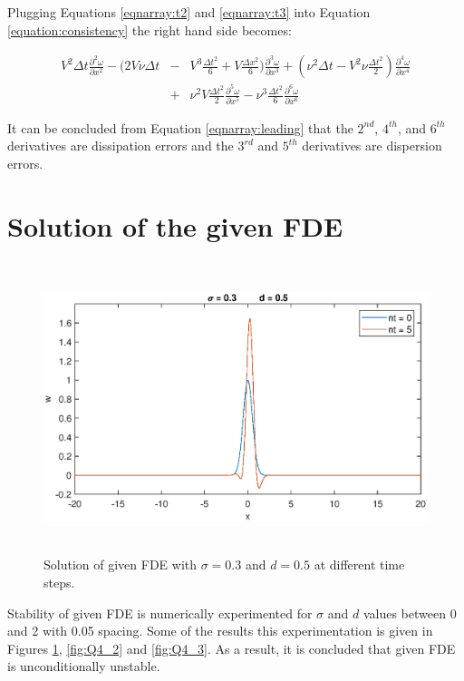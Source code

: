 \documentclass[letterpaper,12pt]{article}
\begin{document}
Plugging Equations \ref{eqnarray:t2} and \ref{eqnarray:t3} into Equation \ref{equation:consistency} the
right hand side becomes:

\begin{eqnarray}
	V^2\Delta t \frac{\partial^2 \omega}{\partial x^2} - (2V\nu\Delta t &-&V^3\frac{\Delta t^2}{6} + V\frac{\Delta x^2}{6})\frac{\partial^3 \omega}{\partial x^3} + (\nu^2\Delta t -V^2\nu\frac{\Delta t^2}{2})\frac{\partial^4 \omega}{\partial x^4} \nonumber \\
	&+& \nu^2V\frac{\Delta t^2}{2}\frac{\partial^5 \omega}{\partial x^5} - \nu^3\frac{\Delta t^2}{6}\frac{\partial^6 \omega}{\partial x^6}
	\label{eqnarray:leading}
\end{eqnarray}

It can be concluded from Equation \ref{eqnarray:leading} that the $2^{nd}$, $4^{th}$, and $6^{th}$ derivatives are dissipation errors
and the $3^{rd}$ and $5^{th}$ derivatives are dispersion errors.

\newpage

\section{Solution of the given FDE}

\begin{figure}[!ht] 
	\centering 
	\includegraphics[max height=8.5cm]{graphs/Question4/sigma03d05.eps}
	\caption{Solution of given FDE with $\sigma= 0.3$ and $d=0.5$ at different time steps.}
	\label{fig:Q4_1}
\end{figure}

 \vspace{1cm}

Stability of given FDE is numerically experimented for $\sigma$ and $d$ values between 0 and 2 with 0.05 spacing. 
Some of the results this experimentation is given in Figures \ref{fig:Q4_1}, \ref{fig:Q4_2} and \ref{fig:Q4_3}. 
As a result, it is concluded that given FDE is unconditionally unstable.
\end{document}
